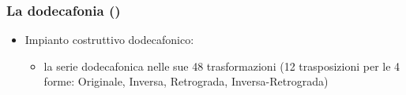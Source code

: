 \begin{frame}
    \frametitle{La dodecafonia ()}

    \begin{itemize}

        \item Impianto costruttivo dodecafonico:

        \begin{itemize}

            \item la serie dodecafonica nelle sue 48 trasformazioni
                (12 trasposizioni per le 4 forme:
                Originale, Inversa, Retrograda, Inversa-Retrograda)

        \end{itemize}

    \end{itemize}

\end{frame}

